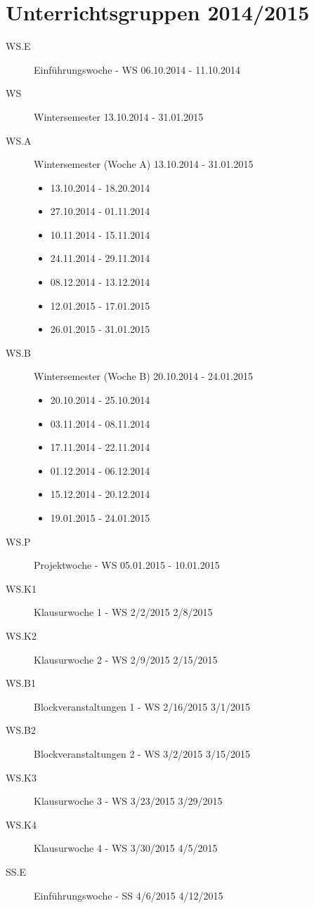 
\section{Unterrichtsgruppen 2014/2015}
\label{sec:unterrichtsgruppen-values}
\begin{description}
	\item[WS.E]	Einführungswoche - WS 06.10.2014 - 11.10.2014	 	 	 	
	\item[WS]	Wintersemester	13.10.2014 - 31.01.2015	
	\item[WS.A]	Wintersemester (Woche A) 13.10.2014 - 31.01.2015
		\begin{itemize}
			\item 13.10.2014 - 18.20.2014
			\item 27.10.2014 - 01.11.2014
			\item 10.11.2014 - 15.11.2014
			\item 24.11.2014 - 29.11.2014
			\item 08.12.2014 - 13.12.2014
			\item 12.01.2015 - 17.01.2015
			\item 26.01.2015 - 31.01.2015
		\end{itemize}
	\item[WS.B]	Wintersemester (Woche B) 20.10.2014 - 24.01.2015
		\begin{itemize}
			\item 20.10.2014 - 25.10.2014
			\item 03.11.2014 - 08.11.2014
			\item 17.11.2014 - 22.11.2014
			\item 01.12.2014 - 06.12.2014
			\item 15.12.2014 - 20.12.2014
			\item 19.01.2015 - 24.01.2015
		\end{itemize}
	\item[WS.P]	Projektwoche - WS 05.01.2015 - 10.01.2015	 	 	 	
	\item[WS.K1] Klausurwoche 1 - WS	2/2/2015	2/8/2015	 	 	 	
	\item[WS.K2] Klausurwoche 2 - WS	2/9/2015	2/15/2015	 	 	 	
	\item[WS.B1] Blockveranstaltungen 1 - WS	2/16/2015	3/1/2015	 	 	 	
	\item[WS.B2] Blockveranstaltungen 2 - WS	3/2/2015	3/15/2015	 	 	 	
	\item[WS.K3] Klausurwoche 3 - WS	3/23/2015	3/29/2015	 	 	 	
	\item[WS.K4] Klausurwoche 4 - WS	3/30/2015	4/5/2015	 	 	 	
	\item[SS.E]	Einführungswoche - SS	4/6/2015	4/12/2015	 	 	 	

\end{description}
